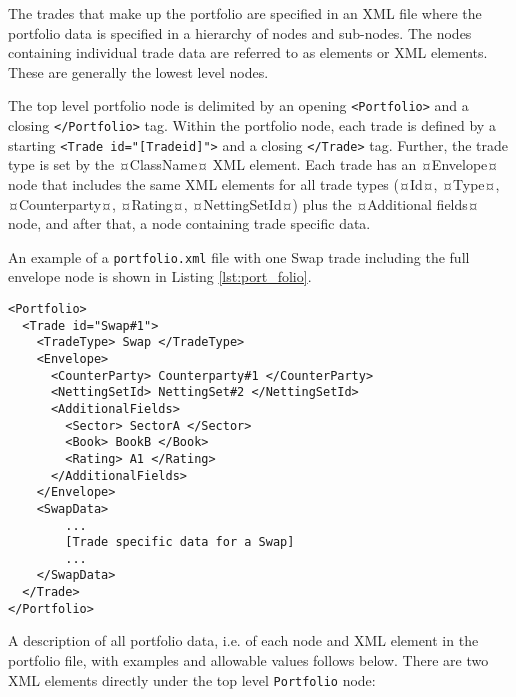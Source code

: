 The trades that make up the portfolio are specified in an XML file where the portfolio data is specified in a hierarchy of nodes and sub-nodes.  The nodes containing individual trade data are referred to as elements or XML elements. These are generally the lowest level nodes.

\vspace{1em}

The top level portfolio node is delimited by an opening {\tt <Portfolio>} and a closing {\tt </Portfolio>} tag. Within the portfolio node, each trade is defined by a starting {\tt <Trade id="[Tradeid]">} and a closing {\tt </Trade>} tag.  Further, the trade type is set by the ¤ClassName¤ XML element. Each trade has an ¤Envelope¤ node that includes the same XML elements  for all trade types (¤Id¤, ¤Type¤, ¤Counterparty¤, ¤Rating¤, ¤NettingSetId¤) plus the 
¤Additional fields¤ node, and after that, a node containing trade specific data.

\vspace{1em}
An example of a {\tt portfolio.xml} file with one Swap trade including the full envelope node is shown in Listing \ref{lst:port_folio}.


{\footnotesize
\begin{lstlisting}[caption=Portfolio, label=lst:port_folio]
<Portfolio>
  <Trade id="Swap#1">
    <TradeType> Swap </TradeType>
    <Envelope>
      <CounterParty> Counterparty#1 </CounterParty>
      <NettingSetId> NettingSet#2 </NettingSetId>
      <AdditionalFields>
        <Sector> SectorA </Sector>
        <Book> BookB </Book>
        <Rating> A1 </Rating>
      </AdditionalFields>
    </Envelope>
    <SwapData>
        ...
        [Trade specific data for a Swap]
        ...
    </SwapData>
  </Trade>
</Portfolio>
\end{lstlisting}
}

A description of all portfolio data, i.e. of each node and XML element in the portfolio file, with examples and allowable values follows below. There are two XML elements directly under the top level {\tt Portfolio} node:

